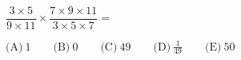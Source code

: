 
$\dfrac{3\times 5}{9\times 11}\times \dfrac{7\times 9\times 11}{3\times 5\times 7}=$

$\text{(A)}\ 1 \qquad \text{(B)}\ 0 \qquad \text{(C)}\ 49 \qquad \text{(D)}\ \frac{1}{49} \qquad \text{(E)}\ 50$
